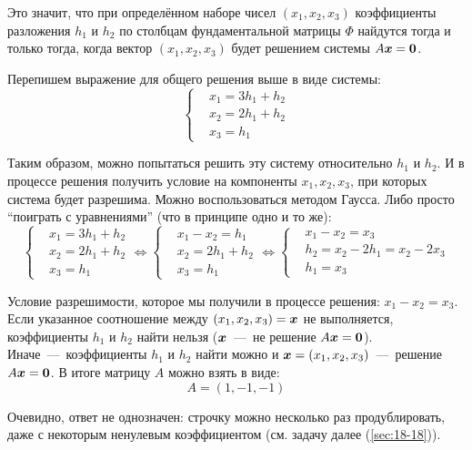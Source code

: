 \documentclass[a4paper,12pt]{article}
\begin{document}
\begin{solution}
    Это значит, что при определённом наборе чисел $(x_1, x_2, x_3)$ коэффициенты разложения $h_1$ и $h_2$ по столбцам фундаментальной матрицы $\Phi$ найдутся тогда и только тогда, когда вектор $(x_1, x_2, x_3)$ будет решением системы $A \bds x \hm= \bds 0$.
    
    Перепишем выражение для общего решения выше в виде системы:
    \[
      \left\{
        \begin{aligned}
          &x_1 = 3h_1 + h_2\\
          &x_2 = 2h_1 + h_2\\
          &x_3 = h_1
        \end{aligned}
      \right.
    \]
    
    Таким образом, можно попытаться решить эту систему относительно $h_1$ и $h_2$.
    И в процессе решения получить условие на компоненты $x_1, x_2, x_3$, при которых система будет разрешима.
    Можно воспользоваться методом Гаусса.
    Либо просто ``поиграть с уравнениями'' (что в принципе одно и то же):
    \[
      \left\{
        \begin{aligned}
          &x_1 = 3h_1 + h_2\\
          &x_2 = 2h_1 + h_2\\
          &x_3 = h_1
        \end{aligned}
      \right. \Leftrightarrow \left\{
        \begin{aligned}
          &x_1 - x_2 = h_1\\
          &x_2 = 2h_1 + h_2\\
          &x_3 = h_1
        \end{aligned}
      \right. \Leftrightarrow \left\{
        \begin{aligned}
          &x_1 - x_2 = x_3\\
          &h_2 = x_2 - 2h_1 = x_2 - 2x_3\\
          &h_1 = x_3
        \end{aligned}
      \right.
    \]
    
    Условие разрешимости, которое мы получили в процессе решения: $\boxed{x_1 - x_2 = x_3}$.
    Если указанное соотношение между $(x_1, x_2, x_3) \hm= \bds x$ не выполняется, коэффициенты $h_1$ и $h_2$ найти нельзя ($\boldsymbol x$~---~не решение $A \bds x \hm= \bds 0$).
    Иначе~---~коэффициенты $h_1$ и $h_2$ найти можно и $\bds x \hm= (x_1, x_2, x_3)$~---~решение $A \bds x \hm= \bds 0$.
    В итоге матрицу $A$ можно взять в виде:
    \[
      A = (1, -1, -1)
    \]

    Очевидно, ответ не однозначен: строчку можно несколько раз продублировать, даже с некоторым ненулевым коэффициентом (см. задачу далее (\ref{sec:18-18})).
    

\end{solution}
\end{document}
